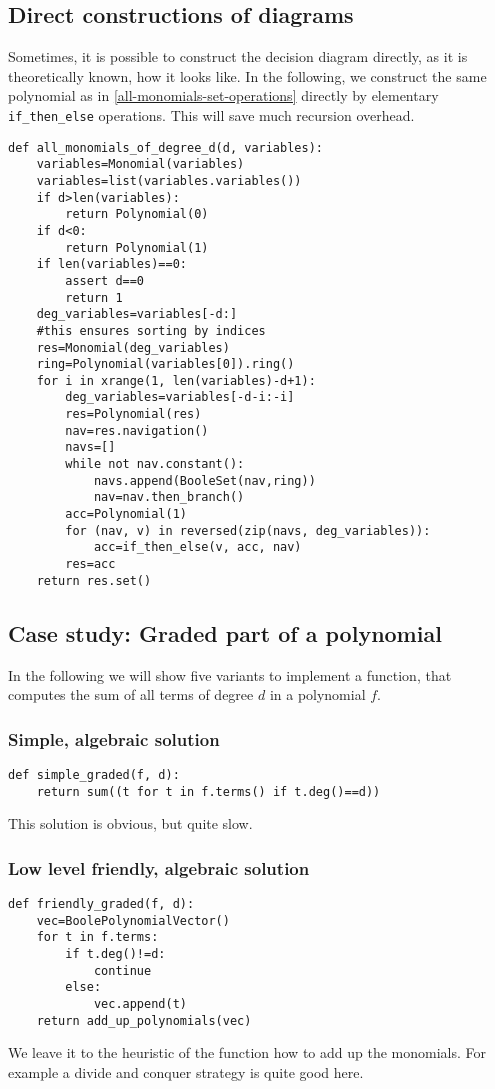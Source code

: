 \subsection{Direct constructions of diagrams}
Sometimes, it is possible to construct the decision diagram directly, as it is theoretically known, how it looks like.
In the following, we construct the same polynomial as in \ref{all-monomials-set-operations} directly by elementary \lstinline|if_then_else| operations. This will save much recursion overhead.
\begin{lstlisting}
def all_monomials_of_degree_d(d, variables):
    variables=Monomial(variables)
    variables=list(variables.variables())
    if d>len(variables):
        return Polynomial(0)
    if d<0:
        return Polynomial(1)
    if len(variables)==0:
        assert d==0
        return 1
    deg_variables=variables[-d:]
    #this ensures sorting by indices
    res=Monomial(deg_variables)
    ring=Polynomial(variables[0]).ring()
    for i in xrange(1, len(variables)-d+1):
        deg_variables=variables[-d-i:-i]
        res=Polynomial(res)
        nav=res.navigation()
        navs=[]
        while not nav.constant():
            navs.append(BooleSet(nav,ring))
            nav=nav.then_branch()
        acc=Polynomial(1)
        for (nav, v) in reversed(zip(navs, deg_variables)):
            acc=if_then_else(v, acc, nav)
        res=acc
    return res.set()
\end{lstlisting}

\subsection{Case study: Graded part of a polynomial}
In the following we will show five variants to implement a function, that computes the sum of all terms of degree $d$ in a polynomial $f$.

\subsubsection{Simple, algebraic solution}
\begin{lstlisting}
def simple_graded(f, d):
    return sum((t for t in f.terms() if t.deg()==d))   
\end{lstlisting}
This solution is obvious, but quite slow.

\subsubsection{Low level friendly, algebraic solution}
\begin{lstlisting}
def friendly_graded(f, d):
    vec=BoolePolynomialVector()
    for t in f.terms:
        if t.deg()!=d:
            continue
        else:
            vec.append(t)
    return add_up_polynomials(vec)
\end{lstlisting}
We leave it to the heuristic of the  function how to add up the monomials. For example a divide and conquer strategy is quite good here.

